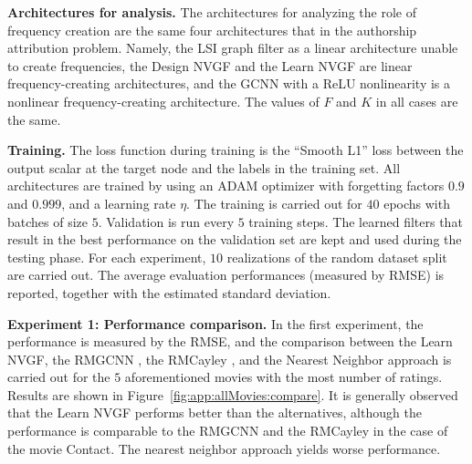 \textbf{Architectures for analysis.} The architectures for analyzing the role of frequency creation are the same four architectures that in the authorship attribution problem. Namely, the LSI graph filter as a linear architecture unable to create frequencies, the Design NVGF and the Learn NVGF are linear frequency-creating architectures, and the GCNN with a ReLU nonlinearity is a nonlinear frequency-creating architecture. The values of $F$ and $K$ in all cases are the same.

\textbf{Training.} The loss function during training is the ``Smooth L1'' loss between the output scalar at the target node and the labels in the training set. All architectures are trained by using an ADAM optimizer \cite{Kingma15-ADAM} with forgetting factors $0.9$ and $0.999$, and a learning rate $\eta$. The training is carried out for $40$ epochs with batches of size $5$. Validation is run every $5$ training steps. The learned filters that result in the best performance on the validation set are kept and used during the testing phase. For each experiment, $10$ realizations of the random dataset split are carried out. The average evaluation performances (measured by RMSE) is reported, together with the estimated standard deviation.

\textbf{Experiment 1: Performance comparison.} In the first experiment, the performance is measured by the RMSE, and the comparison between the Learn NVGF, the RMGCNN \cite{Monti2017-RecommendationGNN}, the RMCayley \cite{Levie2018-CayleyNets}, and the Nearest Neighbor approach is carried out for the $5$ aforementioned movies with the most number of ratings. Results are shown in Figure~\ref{fig:app:allMovies:compare}. It is generally observed that the Learn NVGF performs better than the alternatives, although the performance is comparable to the RMGCNN and the RMCayley in the case of the movie Contact. The nearest neighbor approach yields worse performance.

